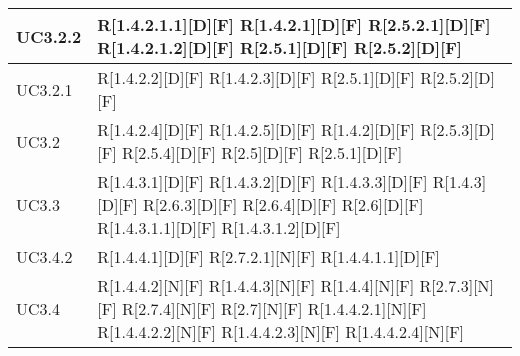 \begin{longtable}{X | X}
\hline
UC3.2.2 & R[1.4.2.1.1][D][F] \newline
R[1.4.2.1][D][F] \newline
R[2.5.2.1][D][F] \newline
R[1.4.2.1.2][D][F] \newline
R[2.5.1][D][F] \newline
R[2.5.2][D][F]  \\
\hline
UC3.2.1 & R[1.4.2.2][D][F] \newline
R[1.4.2.3][D][F] \newline
R[2.5.1][D][F] \newline
R[2.5.2][D][F]  \\
\hline
UC3.2 & R[1.4.2.4][D][F] \newline
R[1.4.2.5][D][F] \newline
R[1.4.2][D][F] \newline
R[2.5.3][D][F] \newline
R[2.5.4][D][F] \newline
R[2.5][D][F] \newline
R[2.5.1][D][F]  \\
\hline
UC3.3 & R[1.4.3.1][D][F] \newline
R[1.4.3.2][D][F] \newline
R[1.4.3.3][D][F] \newline
R[1.4.3][D][F] \newline
R[2.6.3][D][F] \newline
R[2.6.4][D][F] \newline
R[2.6][D][F] \newline
R[1.4.3.1.1][D][F] \newline
R[1.4.3.1.2][D][F]  \\
\hline
UC3.4.2 & R[1.4.4.1][D][F] \newline
R[2.7.2.1][N][F] \newline
R[1.4.4.1.1][D][F]  \\
\hline
UC3.4 & R[1.4.4.2][N][F] \newline
R[1.4.4.3][N][F] \newline
R[1.4.4][N][F] \newline
R[2.7.3][N][F] \newline
R[2.7.4][N][F] \newline
R[2.7][N][F] \newline
R[1.4.4.2.1][N][F] \newline
R[1.4.4.2.2][N][F] \newline
R[1.4.4.2.3][N][F] \newline
R[1.4.4.2.4][N][F] \newline

\end{longtable}
